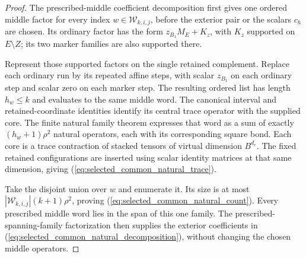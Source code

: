 \begin{proof}\leanok
    The prescribed-middle coefficient decomposition first gives one ordered
    middle factor for every index $w\in\mathcal W_{k,i,j}$, before the exterior
    pair or the scalars $c_h$ are chosen. Its ordinary factor has the form
    $z_{B_1}M_E+K_z$, with $K_z$ supported on $E\setminus Z$; its two marker
    families are also supported there.

    Represent those supported factors on the single retained complement.
    Replace each ordinary run by its repeated affine steps, with scalar
    $z_{B_1}$ on each ordinary step and scalar zero on each marker step.
    The resulting ordered list has length $h_w\le k$ and evaluates to the
    same middle word. The canonical interval and retained-coordinate
    identities identify its central trace operator with the supplied core.
    The finite natural family theorem expresses that word as a sum of exactly
    $(h_w+1)\rho^2$ natural operators, each with its corresponding square bond.
    Each core is a trace contraction of stacked tensors of virtual dimension
    $B^{d_r}$. The fixed retained configurations are inserted using scalar
    identity matrices at that same dimension, giving
    (\ref{eq:selected_common_natural_trace}).

    Take the disjoint union over $w$ and enumerate it. Its size is at most
    $|\mathcal W_{k,i,j}|(k+1)\rho^2$, proving
    (\ref{eq:selected_common_natural_count}). Every prescribed middle word lies
    in the span of this one family. The prescribed-spanning-family
    factorization then supplies the exterior coefficients in
    (\ref{eq:selected_common_natural_decomposition}), without changing the
    chosen middle operators.
\end{proof}

